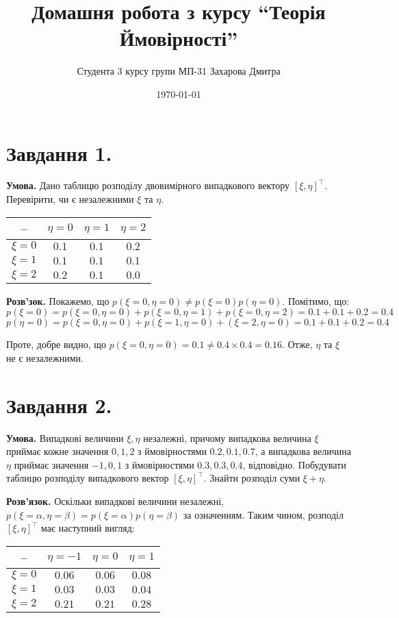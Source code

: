 \documentclass[14pt]{extarticle}
\title{Домашня робота з курсу ``Теорія Ймовірності''}
\author{Студента 3 курсу групи МП-31 Захарова Дмитра}
\date{\today}
\begin{document}
\maketitle

\section*{Завдання 1.}

\textbf{Умова.} Дано таблицю розподілу двовимірного випадкового вектору $[\xi,\eta]^{\top}$. Перевірити, чи є незалежними $\xi$ та $\eta$.

\begin{center}
\begin{tabular}{ |c|c|c|c| } 
 \hline
 -- & $\eta=0$ & $\eta=1$ & $\eta=2$ \\ 
 \hline
 $\xi=0$ & $0.1$ & $0.1$ & $0.2$ \\ 
 \hline
 $\xi=1$ & $0.1$ & $0.1$ & $0.1$ \\ 
 \hline
 $\xi=2$ & $0.2$ & $0.1$ & $0.0$ \\
 \hline
\end{tabular}
\end{center}

\textbf{Розв'зок.} Покажемо, що $p(\xi=0,\eta=0) \neq p(\xi=0)p(\eta=0)$. Помітимо, що:
\[
p(\xi=0) = p(\xi=0,\eta=0) + p(\xi=0,\eta=1) + p(\xi=0,\eta=2) = 0.1 + 0.1 + 0.2 = 0.4
\]
\[
p(\eta=0) = p(\xi=0,\eta=0) + p(\xi=1,\eta=0) + (\xi=2,\eta=0) = 0.1 + 0.1 + 0.2 = 0.4
\]

Проте, добре видно, що $p(\xi=0,\eta=0)=0.1 \neq 0.4 \times 0.4 = 0.16$. Отже, $\eta$ та $\xi$ не є незалежними.

\pagebreak
\section*{Завдання 2.}

\textbf{Умова.} Випадкові величини $\xi,\eta$ незалежні, причому випадкова величина $\xi$ приймає кожне значення $0,1,2$ з ймовірностями $0.2,0.1,0.7$, а випадкова величина $\eta$ приймає значення $-1,0,1$ з ймовірностями $0.3,0.3,0.4$, відповідно. Побудувати
таблицю розподілу випадкового вектор $[\xi,\eta]^{\top}$. Знайти розподіл суми $\xi+\eta$. 

\textbf{Розв'язок.} Оскільки випадкові величини незалежні, $p(\xi=\alpha,\eta=\beta)=p(\xi=\alpha)p(\eta=\beta)$ за означенням. Таким чином, розподіл $[\xi,\eta]^{\top}$ має наступний вигляд:

\begin{center}
\begin{tabular}{ |c|c|c|c| } 
 \hline
 -- & $\eta=-1$ & $\eta=0$ & $\eta=1$ \\ 
 \hline
 $\xi=0$ & $0.06$ & $0.06$ & $0.08$ \\ 
 \hline
 $\xi=1$ & $0.03$ & $0.03$ & $0.04$ \\ 
 \hline
 $\xi=2$ & $0.21$ & $0.21$ & $0.28$ \\
 \hline
\end{tabular}
\end{center}
\end{document}
